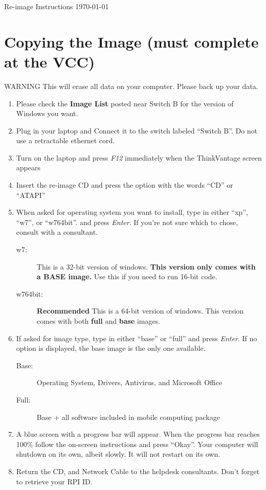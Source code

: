 \documentclass[10pt]{article}
\begin{document}
\begin{flushright}
Re-image Instructions \today
\end{flushright}
\section{Copying the Image (must complete at the VCC)}
{\sc WARNING This will erase all data on your computer. Please back up your data.}
\begin{enumerate}
\item Please check the {\bf Image List} posted near Switch B for the version of Windows you want.
\item Plug in your laptop and Connect it to the switch labeled ``Switch B''. Do not use a retractable ethernet cord.
\item Turn on the laptop and press \emph{F12} immediately when the ThinkVantage screen appears
\item Insert the re-image CD and press the option with the words ``CD'' or ``ATAPI''
\item When asked for operating system you want to install, type in either ``xp'', ``w7'', or ``w764bit''. and press \emph{Enter}. If you're not sure which to chose, consult with a consultant.
\begin{description}
\item[w7:] This is a 32-bit version of windows. {\bf This version only comes with a BASE image.} Use this if you need to run 16-bit code.
\item[w764bit:] {\bf Recommended} This is a 64-bit version of windows. This version comes with both {\bf full} and {\bf base} images.
\end{description}
\item If asked for image type, type in either ``base'' or ``full'' and press \emph{Enter}. If no option is displayed, the base image is the only one available.
\begin{description}
\item[Base:] Operating System, Drivers, Antivirus, and Microsoft Office
\item[Full:] Base + all software included in mobile computing package
\end{description}
\item A blue screen with a progress bar will appear. When the progress bar reaches 100\% follow the on-screen instructions and press ``Okay''. Your computer will shutdown on its own, albeit slowly. It will not restart on its own.
\item Return the CD, and Network Cable to the helpdesk consultants. Don't forget to retrieve your RPI ID.

\end{enumerate}
\end{document}
